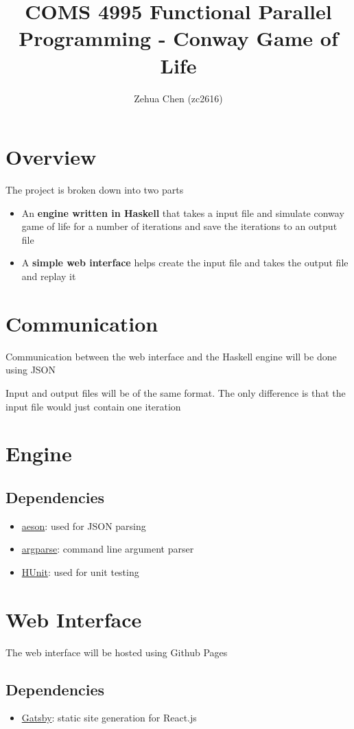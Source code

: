 \documentclass{article}
\title{COMS 4995 Functional Parallel Programming - Conway Game of Life}
\author{Zehua Chen (zc2616)}
\begin{document}
  \maketitle
  \tableofcontents

  \section{Overview}

    The project is broken down into two parts

    \begin{itemize}
      \item An \textbf{engine written in Haskell} that takes a input file and simulate
      conway game of life for a number of iterations and save the iterations
      to an output file
      \item A \textbf{simple web interface} helps create the input file and takes the
      output file and replay it
    \end{itemize}

  \section{Communication}

    Communication between the web interface and the Haskell engine will be done
    using JSON

    Input and output files will be of the same format. The only difference
    is that the input file would just contain one iteration

    

  \section{Engine}

    \subsection{Dependencies}

      \begin{itemize}
        \item \href{https://hackage.haskell.org/package/aeson-2.0.2.0/docs/Data-Aeson.html}{aeson}:
        used for JSON parsing
        \item \href{https://hackage.haskell.org/package/argparser-0.3.4/docs/System-Console-ArgParser.html}{argparse}:
        command line argument parser
        \item \href{https://hackage.haskell.org/package/HUnit-1.6.2.0/docs/Test-HUnit.html}{HUnit}:
        used for unit testing
      \end{itemize}

  \section{Web Interface}

    The web interface will be hosted using Github Pages

    \subsection{Dependencies}

      \begin{itemize}
        \item \href{https://www.gatsbyjs.com}{Gatsby}: static site generation
        for React.js
      \end{itemize}
\end{document}
